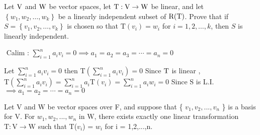 		\begin{example}
		Let \(\rm V\) and \(\rm W\) be vector spaces, let \(\mathrm{T}:\rm  V \rightarrow W\) be linear, and let
\(\left\{w_{1}, w_{2}, \ldots, w_{k}\right\}\) be a linearly independent subset of \(\rm R(T)\). Prove that
if \(S=\left\{v_{1}, v_{2}, \ldots, v_{k}\right\}\) is chosen so that \(\mathrm{T}\left(v_{i}\right)=w_{i}\) for \(i=1,2, \ldots, k\),
then \(S\) is linearly independent.
\begin{sol*}$ $
Calim : $\sum_{i=1}^n a_iv_i = 0\implies a_1 = a_2 = a_3 =\cdots =a_n = 0 $
	
	Let \(\sum_{i=1}^{n} a_{i} v_{i}=0\)
then \(\mathrm{T}\left(\sum_{i=1}^{n} a_{i} v_{i}\right)=0\)
Since \(\rm T\) is linear , \(\mathrm{T}\left(\sum_{i=1}^{n} a_{i} v_{i}\right)=\sum_{i=1}^{n} a_{i} \mathrm{T}\left(v_{i}  \right)=\sum_{i=1}^na_iw_i = 0\)
Since $\mathrm{S}$ is L.I. $\implies a_1 = a_2=\cdots = a_n = 0$ 
\end{sol*}
	

\end{example}
\begin{thm*}[2.6]
$ $ \\Let V and W be vector spaces over F, and suppose that \{ $v_1,v_2,...,v_n$ \} is a basis for V. For $w_1,w_2,...,w_n$ in W, there exists exactly one linear transformation $\mathrm{T}: \mathrm{V}  \rightarrow \mathrm{W}$ such that T($v_i$) = $w_i$ for i = 1,2,...,n.
\end{thm*}
		
		
